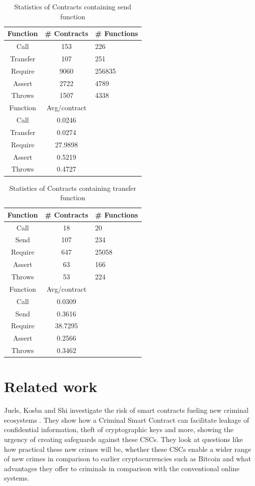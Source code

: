 \documentclass[sigconf]{acmart}
\begin{document}
\begin{table}
  \caption{Statistics of Contracts containing send function}
  \label{tab:send}
  \begin{tabular}{ccl}
    \toprule
    Function & \# Contracts & \# Functions\\
    \midrule
    Call&153&226\\
    Transfer&107&251\\
    Require&9060&256835\\
    Assert&2722&4789\\
    Throws&1507&4338\\
    \toprule
    Function & Avg/contract\\
    \midrule
    Call&0.0246\\
    Transfer&0.0274\\
    Require&27.9898\\
    Assert&0.5219\\
    Throws&0.4727\\
  \bottomrule
\end{tabular}
\end{table}

\begin{table}
  \caption{Statistics of Contracts containing transfer function}
  \label{tab:transfer}
  \begin{tabular}{ccl}
    \toprule
    Function & \# Contracts & \# Functions\\
    \midrule
    Call&18&20\\
    Send&107&234\\
    Require&647&25058\\
    Assert&63&166\\
    Throws&53&224\\
    \toprule
    Function & Avg/contract\\
    \midrule
    Call&0.0309\\
    Send&0.3616\\
    Require&38.7295\\
    Assert&0.2566\\
    Throws&0.3462\\
  \bottomrule
\end{tabular}
\end{table}
\section{Related work}


Juels, Kosba and Shi\cite{criminal} investigate the risk of smart contracts fueling new criminal ecosystems . They show how a Criminal Smart Contract can facilitate leakage of confidential information, theft of cryptographic keys and more, showing the urgency of creating safeguards against these CSCs. They look at questions like how practical these new crimes will be, whether these CSCs enable a wider range of new crimes in comparison to earlier cryptocurrencies such as Bitcoin and what advantages they offer to criminals in comparison with the conventional online systems. 
\end{document}
